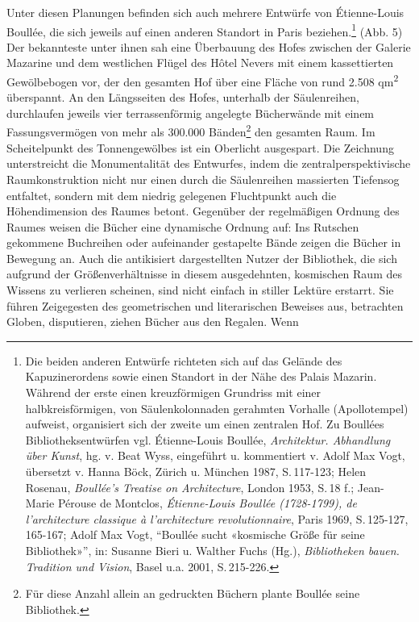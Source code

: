 Unter diesen Planungen befinden sich auch mehrere Entwürfe von
Étienne-Louis Boullée, die sich jeweils auf einen anderen Standort in
Paris beziehen.\footnote{Die beiden anderen Entwürfe richteten sich auf
  das Gelände des Kapuzinerordens sowie einen Standort in der Nähe des
  Palais Mazarin. Während der erste einen kreuzförmigen Grundriss mit
  einer halbkreisförmigen, von Säulenkolonnaden gerahmten Vorhalle
  (Apollotempel) aufweist, organisiert sich der zweite um einen
  zentralen Hof. Zu Boullées Bibliotheksentwürfen vgl. Étienne-Louis
  Boullée, \emph{Architektur. Abhandlung über Kunst}, hg. v. Beat Wyss,
  eingeführt u. kommentiert v. Adolf Max Vogt, übersetzt v. Hanna Böck,
  Zürich u. München 1987, S.\,117-123; Helen Rosenau, \emph{Boullée's
  Treatise on Architecture}, London 1953, S.\,18 f.; Jean-Marie Pérouse
  de Montclos, \emph{Étienne-Louis Boullée (1728-1799), de
  l'architecture classique à l'architecture revolutionnaire}, Paris
  1969, S.\,125-127, 165-167; Adolf Max Vogt, \enquote{Boullée sucht
  «kosmische Größe für seine Bibliothek»}, in: Susanne Bieri u. Walther
  Fuchs (Hg.), \emph{Bibliotheken bauen. Tradition und Vision}, Basel
  u.a. 2001, S.\,215-226.} (Abb. 5) Der bekannteste unter ihnen sah eine
Überbauung des Hofes zwischen der Galerie Mazarine und dem westlichen
Flügel des Hôtel Nevers mit einem kassettierten Gewölbebogen vor, der
den gesamten Hof über eine Fläche von rund 2.508 qm\textsuperscript{2}
überspannt. An den Längsseiten des Hofes, unterhalb der Säulenreihen,
durchlaufen jeweils vier terrassenförmig angelegte Bücherwände mit einem
Fassungsvermögen von mehr als 300.000 Bänden\footnote{Für diese Anzahl
  allein an gedruckten Büchern plante Boullée seine Bibliothek.} den
gesamten Raum. Im Scheitelpunkt des Tonnengewölbes ist ein Oberlicht
ausgespart. Die Zeichnung unterstreicht die Monumentalität des
Entwurfes, indem die zentralperspektivische Raumkonstruktion nicht nur
einen durch die Säulenreihen massierten Tiefensog entfaltet, sondern mit
dem niedrig gelegenen Fluchtpunkt auch die Höhendimension des Raumes
betont. Gegenüber der regelmäßigen Ordnung des Raumes weisen die Bücher
eine dynamische Ordnung auf: Ins Rutschen gekommene Buchreihen oder
aufeinander gestapelte Bände zeigen die Bücher in Bewegung an. Auch die
antikisiert dargestellten Nutzer der Bibliothek, die sich aufgrund der
Größenverhältnisse in diesem ausgedehnten, kosmischen Raum des Wissens
zu verlieren scheinen, sind nicht einfach in stiller Lektüre erstarrt.
Sie führen Zeigegesten des geometrischen und literarischen Beweises aus,
betrachten Globen, disputieren, ziehen Bücher aus den Regalen. Wenn
